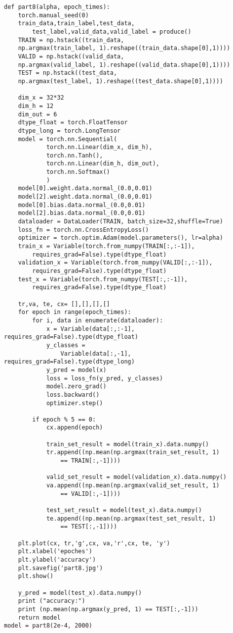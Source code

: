 \documentclass{article}
\begin{document}
\Large\begin{lstlisting}[basicstyle=\large\ttfamily]
def part8(alpha, epoch_times):
    torch.manual_seed(0)
    train_data,train_label,test_data,
        test_label,valid_data,valid_label = produce()
    TRAIN = np.hstack((train_data,
    np.argmax(train_label, 1).reshape((train_data.shape[0],1))))
    VALID = np.hstack((valid_data,
    np.argmax(valid_label, 1).reshape((valid_data.shape[0],1))))
    TEST = np.hstack((test_data,
    np.argmax(test_label, 1).reshape((test_data.shape[0],1))))
    
    dim_x = 32*32
    dim_h = 12
    dim_out = 6
    dtype_float = torch.FloatTensor
    dtype_long = torch.LongTensor
    model = torch.nn.Sequential(
            torch.nn.Linear(dim_x, dim_h),
            torch.nn.Tanh(),
            torch.nn.Linear(dim_h, dim_out),
            torch.nn.Softmax()
            )
    model[0].weight.data.normal_(0.0,0.01)
    model[2].weight.data.normal_(0.0,0.01)
    model[0].bias.data.normal_(0.0,0.01)
    model[2].bias.data.normal_(0.0,0.01)
    dataloader = DataLoader(TRAIN, batch_size=32,shuffle=True)
    loss_fn = torch.nn.CrossEntropyLoss()
    optimizer = torch.optim.Adam(model.parameters(), lr=alpha)
    train_x = Variable(torch.from_numpy(TRAIN[:,:-1]),
        requires_grad=False).type(dtype_float)
    validation_x = Variable(torch.from_numpy(VALID[:,:-1]),
        requires_grad=False).type(dtype_float)
    test_x = Variable(torch.from_numpy(TEST[:,:-1]),
        requires_grad=False).type(dtype_float)
    
    tr,va, te, cx= [],[],[],[]
    for epoch in range(epoch_times):
        for i, data in enumerate(dataloader):
            x = Variable(data[:,:-1], requires_grad=False).type(dtype_float)
            y_classes = 
                Variable(data[:,-1], requires_grad=False).type(dtype_long)
            y_pred = model(x)
            loss = loss_fn(y_pred, y_classes)
            model.zero_grad()
            loss.backward() 
            optimizer.step()
        
        if epoch % 5 == 0:
            cx.append(epoch)
            
            train_set_result = model(train_x).data.numpy()
            tr.append((np.mean(np.argmax(train_set_result, 1) 
                == TRAIN[:,-1])))

            valid_set_result = model(validation_x).data.numpy()
            va.append((np.mean(np.argmax(valid_set_result, 1) 
                == VALID[:,-1])))
            
            test_set_result = model(test_x).data.numpy()
            te.append((np.mean(np.argmax(test_set_result, 1) 
                == TEST[:,-1])))
            
    plt.plot(cx, tr,'g',cx, va,'r',cx, te, 'y')
    plt.xlabel('epoches')
    plt.ylabel('accuracy')
    plt.savefig('part8.jpg')
    plt.show()

    y_pred = model(test_x).data.numpy()
    print ("accuracy:")
    print (np.mean(np.argmax(y_pred, 1) == TEST[:,-1]))
    return model
model = part8(2e-4, 2000)
\end{lstlisting}
\end{document}
